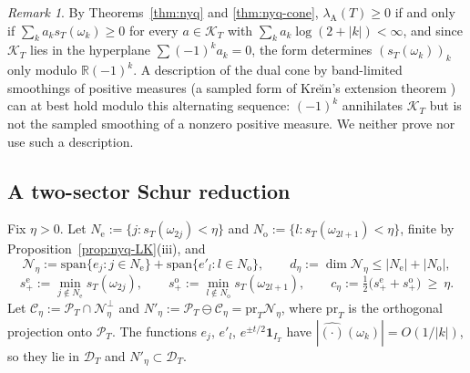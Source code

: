 \documentclass[11pt]{amsart}
\theoremstyle{definition}
\theoremstyle{remark}
\newtheorem{remark}[theorem]{Remark}
\newcommand{\R}{\mathbb R}
\newcommand{\PT}{\mathcal P_T}
\newcommand{\IT}{I_T}
\newcommand{\lamA}{\lambda_{\mathrm A}(T)}
\begin{document}
\begin{remark}\label{rem:nyq-dual}
By Theorems~\ref{thm:nyq} and \ref{thm:nyq-cone}, $\lamA\ge0$ if and only if $\sum_ka_ks_T(\omega_k)\ge0$ for every
$a\in\mathcal K_T$ with $\sum_ka_k\log(2+|k|)<\infty$, and since $\mathcal K_T$ lies in the hyperplane
$\sum(-1)^ka_k=0$, the form determines $(s_T(\omega_k))_k$ only modulo $\R(-1)^k$. A description of the dual cone by
band-limited smoothings of positive measures (a sampled form of Kre\u{\i}n's extension theorem \cite{Krein1940})
can at best hold modulo this alternating sequence: $(-1)^k$ annihilates $\mathcal K_T$ but is not the sampled
smoothing of a nonzero positive measure. We neither prove nor use such a description.
\end{remark}

\subsection{A two-sector Schur reduction}
Fix $\eta>0$. Let $N_{\mathrm e}:=\{j:s_T(\omega_{2j})<\eta\}$ and $N_{\mathrm o}:=\{l:s_T(\omega_{2l+1})<\eta\}$, finite by
Proposition~\ref{prop:nyq-LK}(iii), and
\[
\mathcal N_\eta:=\mathrm{span}\{e_j:j\in N_{\mathrm e}\}+\mathrm{span}\{e'_l:l\in N_{\mathrm o}\},\qquad
d_\eta:=\dim\mathcal N_\eta\le|N_{\mathrm e}|+|N_{\mathrm o}|,
\]
\[
s^{\mathrm e}_+:=\min_{j\notin N_{\mathrm e}}s_T(\omega_{2j}),\qquad s^{\mathrm o}_+:=\min_{l\notin N_{\mathrm o}}s_T(\omega_{2l+1}),\qquad
c_\eta:=\tfrac12\big(s^{\mathrm e}_++s^{\mathrm o}_+\big)\ \ge\ \eta .
\]
Let $\mathcal C_\eta:=\PT\cap\mathcal N_\eta^\perp$ and $N'_\eta:=\PT\ominus\mathcal C_\eta=\mathrm{pr}_T\mathcal N_\eta$, where
$\mathrm{pr}_T$ is the orthogonal projection onto $\PT$. The functions $e_j$, $e'_l$, $e^{\pm t/2}\mathbf 1_{\IT}$ have
$|\widehat{(\cdot)}(\omega_k)|=O(1/|k|)$, so they lie in $\mathcal D_T$ and $N'_\eta\subset\mathcal D_T$.
\end{document}
